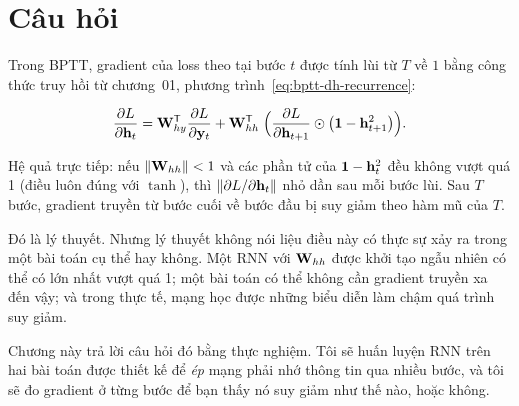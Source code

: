 %

\section{Câu hỏi}
\label{sec:ch02-dat-van-de}

Trong BPTT, gradient của loss theo  tại bước
$t$ được tính lùi
từ $T$ về $1$ bằng công thức truy hồi từ chương~01,
phương trình~\eqref{eq:bptt-dh-recurrence}:

\[
\frac{\partial L}{\partial \mathbf{h}_t}
= \mathbf{W}_{hy}^{\mathsf{T}} \frac{\partial L}{\partial \mathbf{y}_t}
+ \mathbf{W}_{hh}^{\mathsf{T}} \;
  \Bigl(
    \frac{\partial L}{\partial \mathbf{h}_{t+1}}
    \odot \bigl(\mathbf{1} - \mathbf{h}_{t+1}^2\bigr)
  \Bigr).
\]

Hệ quả trực tiếp: nếu $\|\mathbf{W}_{hh}\| < 1$ và các phần tử của
$\mathbf{1} - \mathbf{h}_t^2$ đều không vượt quá 1 (điều luôn đúng với
$\tanh$), thì $\|\partial L / \partial \mathbf{h}_t\|$ nhỏ dần sau mỗi
bước lùi. Sau $T$ bước, gradient truyền từ bước cuối về bước đầu bị
suy giảm theo hàm mũ của $T$.

Đó là lý thuyết. Nhưng lý thuyết không nói liệu điều này có thực sự xảy
ra trong một bài toán cụ thể hay không. Một RNN với $\mathbf{W}_{hh}$ được
khởi tạo ngẫu nhiên có thể có  lớn nhất vượt quá 1;
một bài toán
có thể không cần gradient truyền xa đến vậy; và trong thực tế, mạng học
được những biểu diễn làm chậm quá trình suy giảm.

Chương này trả lời câu hỏi đó bằng thực nghiệm. Tôi sẽ huấn luyện RNN
trên hai bài toán được thiết kế để \emph{ép} mạng phải nhớ thông tin qua
nhiều bước, và tôi sẽ đo gradient ở từng bước để bạn thấy nó suy giảm
như thế nào, hoặc không.
